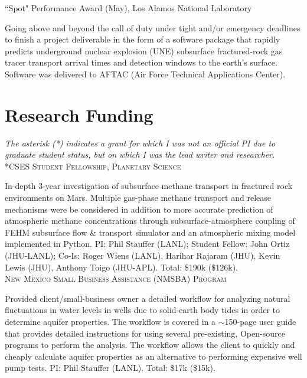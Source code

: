 \documentclass[11pt, letterpaper]{article}
\newcommand{\years}[1]{\marginnote{\scriptsize #1}}
\begin{document}
\years{2018}“Spot" Performance Award (May), Los Alamos National Laboratory

    Going above and beyond the call of duty under tight and/or emergency
    deadlines to finish a project deliverable in the form of a software package
    that rapidly predicts underground nuclear explosion (UNE) subsurface
    fractured-rock gas tracer transport arrival times and detection windows to
    the earth's surface. Software was delivered to AFTAC (Air Force Technical
    Applications Center).

\section*{Research Funding}
\label{sec:funding}
\noindent
\emph{The asterisk (*) indicates a grant for which I was not an official PI due
to graduate student status, but on which I was the lead writer and researcher.}\\

\years{2021}\textsc{*CSES Student Fellowship, Planetary Science}

    In-depth 3-year investigation of subsurface methane transport in fractured
    rock environments on Mars. Multiple gas-phase methane transport and release
    mechanisms were be considered in addition to more accurate prediction of
    atmospheric methane concentrations through subsurface-atmosphere coupling
    of \textsc{FEHM} subsurface flow \& transport simulator and an atmospheric mixing model
    implemented in Python.
    PI: Phil Stauffer (LANL); Student Fellow: John Ortiz (JHU-LANL); Co-Is:
    Roger Wiens (LANL), Harihar Rajaram (JHU), Kevin Lewis (JHU), Anthony Toigo
    (JHU-APL). Total: \$190k (\$126k).\\

\years{2021}\textsc{New Mexico Small Business Assistance (NMSBA) Program}

    Provided client/small-business owner a detailed workflow for analyzing
    natural fluctuations in water levels in wells due to solid-earth body tides
    in order to determine aquifer properties. The workflow is covered in a
    $\sim$150-page user guide that provides detailed instructions for using
    several pre-existing, Open-source programs to perform the analysis. The
    workflow allows the client to quickly and cheaply calculate aquifer
    properties as an alternative to performing expensive well pump tests.
	PI: Phil Stauffer (LANL). Total: \$17k (\$15k). \\
\end{document}

